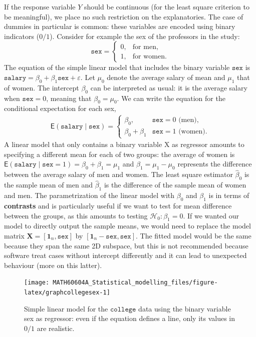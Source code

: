 \documentclass[
  11pt,
  letterpaper,
]{book}
\theoremstyle{definition}
\theoremstyle{definition}
\theoremstyle{definition}
\theoremstyle{remark}
\begin{document}
If the response variable \(Y\) should be continuous (for the least square criterion to be meaningful), we place no such restriction on the explanatories. The case of dummies in particular is common: these variables are encoded using binary indicators (\(0/1\)). Consider for example the sex of the professors in the study:
\[\texttt{sex} = \begin{cases} 0 , & \text{for men},\\
1, & \text{for women.}
\end{cases}
\]
The equation of the simple linear model that includes the binary variable \(\texttt{sex}\) is \(\texttt{salary} = \beta_0 + \beta_1 \texttt{sex} + \varepsilon\). Let \(\mu_0\) denote the average salary of mean and \(\mu_1\) that of women. The intercept \(\beta_0\) can be interpreted as usual: it is the average salary when \(\texttt{sex}=0\), meaning that \(\beta_0=\mu_0\). We can write the equation for the conditional expectation for each sex,
\begin{align*}
\mathsf{E}(\texttt{salary} \mid \texttt{sex})= \begin{cases}
\beta_0, & \texttt{sex}=0 \text{ (men)}, \\
\beta_0 + \beta_1 & \texttt{sex}=1 \text{ (women)}.
\end{cases}
\end{align*}
A linear model that only contains a binary variable \(\mathrm{X}\) as regressor amounts to specifying a different mean for each of two groups: the average of women is \(\mathsf{E}(\texttt{salary} \mid \texttt{sex}=1) = \beta_0 + \beta_1 = \mu_1\) and \(\beta_1=\mu_1-\mu_0\) represents the difference between the average salary of men and women. The least square estimator \(\widehat{\beta}_0\) is the sample mean of men and \(\widehat{\beta}_1\) is the difference of the sample mean of women and men. The parametrization of the linear model with \(\beta_0\) and \(\beta_1\) is in terms of \textbf{contrasts} and is particularly useful if we want to test for mean difference between the groups, as this amounts to testing \(\mathscr{H}_0: \beta_1=0\). If we wanted our model to directly output the sample means, we would need to replace the model matrix \(\mathbf{X}=[\mathbf{1}_n, \texttt{sex}]\) by \([\mathbf{1}_n- \texttt{sex}, \texttt{sex}]\). The fitted model would be the same because they span the same 2D subspace, but this is not recommended because software treat cases without intercept differently and it can lead to unexpected behaviour (more on this latter).

\begin{figure}

{\centering \texttt{[image: MATH60604A\_Statistical\_modelling\_files/figure-latex/graphcollegesex-1]} 

}

\caption{Simple linear model for the $\texttt{college}$ data using the binary variable sex as regressor: even if the equation defines a line, only its values in $0/1$ are realistic.}\label{fig:graphcollegesex}
\end{figure}
\end{document}

